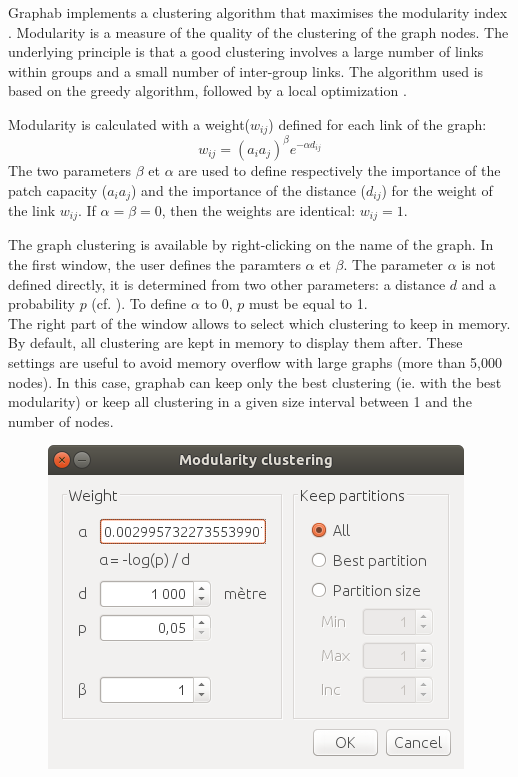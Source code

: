 \documentclass{article}
\begin{document}
Graphab implements a clustering algorithm that maximises the modularity index \cite{Newman2006}. Modularity is a measure of the quality of the clustering of the graph nodes. The underlying principle is that a good clustering involves a large number of links within groups and a small number of inter-group links. The algorithm used is based on the greedy algorithm, followed by a local optimization \cite{Brandes2008}.

Modularity is calculated with a weight($w_{ij}$) defined for each link of the graph:
$$w_{ij} = (a_i a_j)^\beta e^{-\alpha d_{ij}}$$
The two parameters $\beta$ et $\alpha$ are used to define respectively the importance of the patch capacity ($a_i a_j$) and the importance of the distance ($d_{ij}$) for the weight of the link $w_{ij}$. If $\alpha = \beta = 0$, then the weights are identical: $w_{ij} = 1$.  

The graph clustering is available by right-clicking on the name of the graph. In the first window, the user defines the paramters $\alpha$ et $\beta$. The parameter $\alpha$ is not defined directly, it is determined from two other parameters: a distance $d$ and a probability $p$ (cf. ). To define $\alpha$ to 0, $p$ must be equal to 1.\\
The right part of the window allows to select which clustering to keep in memory. By default, all clustering are kept in memory to display them after. These settings are useful to avoid memory overflow with large graphs (more than 5,000 nodes). In this case, graphab can keep only the best clustering (ie. with the best modularity) or keep all clustering in a given size interval between 1 and the number of nodes.

\begin{figure}[H]
	\includegraphics[scale=0.36]{img/manual-en_clustering.png} 
\end{figure}
\end{document}
